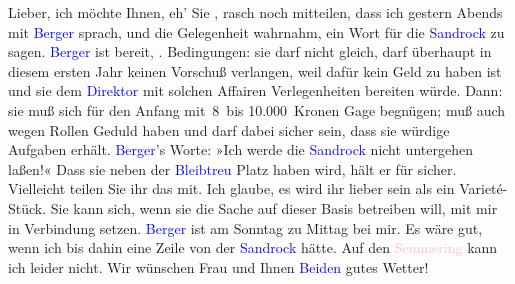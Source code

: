 \pstart{}Lieber,\pend
\pstart
           ich möchte Ihnen, eh’ Sie \label{K_L03552-1v}\label{K_L03552-1h},
               rasch noch mitteilen, dass ich gestern{ }Abends mit \textcolor{blue}{Berger}{}\ledrightnote{\textcolor{blue}{Alfred von Berger}} sprach, und die
               Gelegenheit wahrnahm, ein Wort für die \textcolor{blue}{Sandrock}{}\ledrightnote{\textcolor{blue}{Adele Sandrock}} zu sagen. \textcolor{blue}{Berger}{}\ledrightnote{\textcolor{blue}{Alfred von Berger}} ist bereit,
                  \label{K_L03552-2v}\label{K_L03552-2h}. Bedingungen:
               sie darf nicht gleich, darf überhaupt in diesem ersten Jahr keinen Vorschuß
               verlangen, weil dafür kein Geld zu haben ist und sie dem \textcolor{blue}{Direktor}{}\ledrightnote{{$\rightarrow$}\textcolor{blue}{Alfred von Berger}} mit solchen Affairen
               Verlegenheiten bereiten würde. Dann: sie muß sich für den Anfang mit 8 bis
               10.000 Kronen Gage begnügen; muß auch wegen Rollen Geduld haben und darf dabei sicher
               sein, dass sie würdige Aufgaben erhält. \textcolor{blue}{Berger}{}\ledrightnote{\textcolor{blue}{Alfred von Berger}}’s Worte: »Ich werde die \textcolor{blue}{Sandrock}{}\ledrightnote{\textcolor{blue}{Adele Sandrock}}
               nicht untergehen laßen!« Dass sie neben der \textcolor{blue}{Bleibtreu}{}\ledrightnote{\textcolor{blue}{Hedwig Bleibtreu}} Platz haben wird, hält er für sicher. Vielleicht teilen Sie ihr
               das mit. Ich glaube, es wird ihr lieber sein als ein Varieté-Stück. Sie kann sich,
               wenn sie die Sache auf dieser Basis betreiben will, mit mir in Verbindung setzen. \textcolor{blue}{Berger}{}\ledrightnote{\textcolor{blue}{Alfred von Berger}} ist am Sonntag zu Mittag bei mir. Es wäre gut, wenn ich bis dahin
               eine Zeile von der \textcolor{blue}{Sandrock}{}\ledrightnote{\textcolor{blue}{Adele Sandrock}} hätte. Auf den \textcolor{pink}{Semmering}{}\ledrightnote{\textcolor{pink}{Semmering}} kann ich leider nicht. Wir wünschen Frau
                  \label{K_L03552-3v}\label{K_L03552-3h} und Ihnen \textcolor{blue}{Beiden}{}\ledrightnote{{$\rightarrow$}\textcolor{blue}{Olga Schnitzler}}
               gutes Wetter!\pend
           
